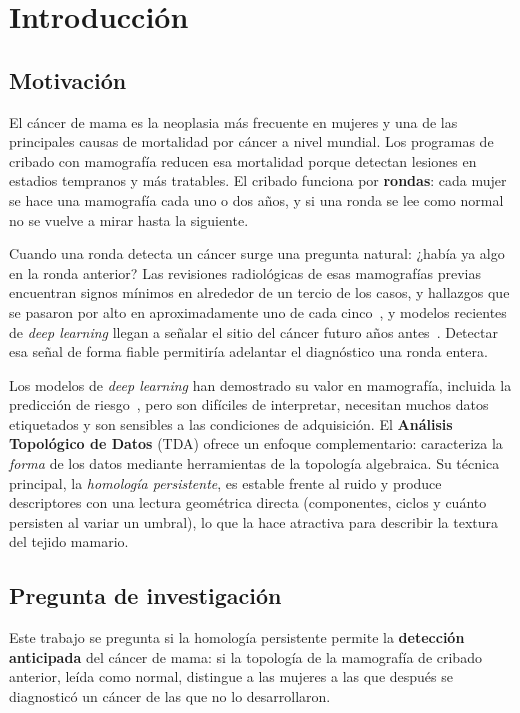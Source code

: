 \chapter{Introducción}
\label{cap:introduccion}

\section{Motivación}
El cáncer de mama es la neoplasia más frecuente en mujeres y una de las
principales causas de mortalidad por cáncer a nivel mundial. Los programas de
cribado con mamografía reducen esa mortalidad porque detectan lesiones en
estadios tempranos y más tratables. El cribado funciona por \textbf{rondas}:
cada mujer se hace una mamografía cada uno o dos años, y si una ronda se lee
como normal no se vuelve a mirar hasta la siguiente.

Cuando una ronda detecta un cáncer surge una pregunta natural: ¿había ya algo
en la ronda anterior? Las revisiones radiológicas de esas mamografías previas
encuentran signos mínimos en alrededor de un tercio de los casos, y
hallazgos que se pasaron por alto en aproximadamente uno de cada
cinco~\cite{hovda2021prior, vandendaele2022review},
y modelos recientes de \textit{deep learning} llegan a señalar el sitio del
cáncer futuro años antes~\cite{martiniussen2026aimarkers}. Detectar esa señal
de forma fiable permitiría adelantar el diagnóstico una ronda entera.

Los modelos de \textit{deep learning} han demostrado su valor en mamografía,
incluida la predicción de riesgo~\cite{yala2019}, pero son difíciles de
interpretar, necesitan muchos datos etiquetados y son sensibles a las
condiciones de adquisición. El \textbf{Análisis Topológico de
Datos} (TDA) ofrece un enfoque complementario: caracteriza la \emph{forma} de
los datos mediante herramientas de la topología algebraica. Su técnica
principal, la \emph{homología persistente}, es estable frente al ruido y
produce descriptores con una lectura geométrica directa (componentes,
ciclos y cuánto persisten al variar un umbral), lo que la hace atractiva para
describir la textura del tejido mamario.

\section{Pregunta de investigación}
Este trabajo se pregunta si la homología persistente permite la
\textbf{detección anticipada} del cáncer de mama: si la topología de la
mamografía de cribado anterior, leída como normal, distingue a las mujeres a
las que después se diagnosticó un cáncer de las que no lo desarrollaron.

